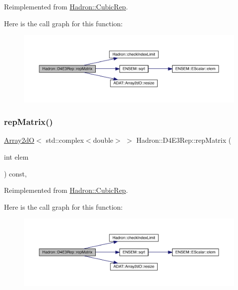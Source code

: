 Reimplemented from \mbox{\hyperlink{structHadron_1_1CubicRep_ac5d7e9e6f4ab1158b5fce3e4ad9e8005}{Hadron\+::\+Cubic\+Rep}}.

Here is the call graph for this function\+:
\nopagebreak
\begin{figure}[H]
\begin{center}
\leavevmode
\includegraphics[width=350pt]{dc/d81/structHadron_1_1D4E3Rep_a313affd6d58648cb82e7095ada7afa8d_cgraph}
\end{center}
\end{figure}
\mbox{\label{structHadron_1_1D4E3Rep_a313affd6d58648cb82e7095ada7afa8d}} 
\subsubsection{\texorpdfstring{repMatrix()}{repMatrix()}\hspace{0.1cm}{\footnotesize\ttfamily [3/3]}}
{\footnotesize\ttfamily \mbox{\hyperlink{classADAT_1_1Array2dO}{Array2dO}}$<$ std\+::complex$<$double$>$ $>$ Hadron\+::\+D4\+E3\+Rep\+::rep\+Matrix (\begin{DoxyParamCaption}\item[{int}]{elem }\end{DoxyParamCaption}) const\hspace{0.3cm}{\ttfamily [inline]}, {\ttfamily [virtual]}}



Reimplemented from \mbox{\hyperlink{structHadron_1_1CubicRep_ac5d7e9e6f4ab1158b5fce3e4ad9e8005}{Hadron\+::\+Cubic\+Rep}}.

Here is the call graph for this function\+:
\nopagebreak
\begin{figure}[H]
\begin{center}
\leavevmode
\includegraphics[width=350pt]{dc/d81/structHadron_1_1D4E3Rep_a313affd6d58648cb82e7095ada7afa8d_cgraph}
\end{center}
\end{figure}


